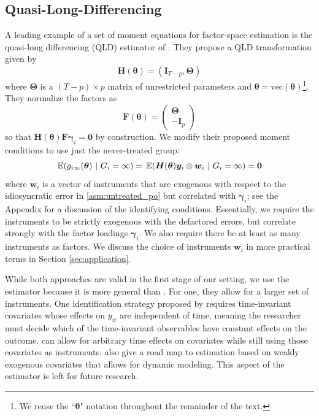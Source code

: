 \documentclass[12pt]{article}
\begin{document}
\subsection{Quasi-Long-Differencing}\label{subsection:QLD}
A leading example of a set of moment equations for factor-space estimation is the quasi-long differencing (QLD) estimator of \citet{Ahn_Lee_Schmidt_2013}. They propose a QLD transformation given by 
\begin{equation}
  \bm H(\bm \theta) = (\bm I_{T-p}, \bm \Theta)
\end{equation}
where $\bm \Theta$ is a $(T-p) \times p$ matrix of unrestricted parameters and $\bm \theta = \text{vec}(\bm \theta)$\footnote{We reuse the ``$\bm \theta$" notation throughout the remainder of the text.}. They normalize the factors as 
\begin{equation}
  \bm{F}(\bm \theta) = 
  \begin{pmatrix}
    \bm \Theta\\
    -\bm I_p
  \end{pmatrix}
\end{equation}
so that $\bm H(\bm \theta) \bm{F} \bm \gamma_i = \bm 0$ by construction. We modify their proposed moment conditions to use just the never-treated group:
\begin{equation}
  \expec{g_{i\infty}(\bm{\theta})}{G_i = \infty} = \expec{\bm H(\bm \theta) \bm y_i \otimes \bm w_i}{G_i = \infty} = \bm 0
\end{equation}
where $\bm w_i$ is a vector of instruments that are exogenous with respect to the idiosyncratic error in \autoref{asm:untreated_po} but correlated with $\bm \gamma_i$; see the Appendix for a discussion of the identifying conditions. Essentially, we require the instruments to be strictly exogenous with the defactored errors, but correlate strongly with the factor loadings $\bm \gamma_i$. We also require there be at least as many instruments as factors. We discuss the choice of instruments $\bm w_i$ in more practical terms in Section \ref{sec:application}.

While both approaches are valid in the first stage of our setting, we use the \citet{Ahn_Lee_Schmidt_2013} estimator because it is more general than \citet{Callaway_Karami_2020}. For one, they allow for a larger set of instruments. One identification strategy proposed by \citet{Callaway_Karami_2020} requires time-invariant covariates whose effects on $y_{it}$ are independent of time, meaning the researcher must decide which of the time-invariant observables have constant effects on the outcome. \citet{Ahn_Lee_Schmidt_2013} can allow for arbitrary time effects on covariates while still using those covariates as instruments. \citet{Ahn_Lee_Schmidt_2013} also give a road map to estimation based on weakly exogenous covariates that allows for dynamic modeling. This aspect of the estimator is left for future research.
\end{document}

